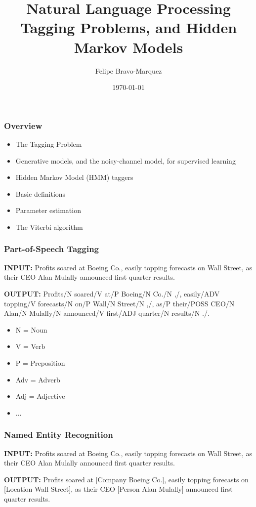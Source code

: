\documentclass[handout]{beamer}
\title{Natural Language Processing \\ Tagging Problems, and Hidden Markov Models}
\author[Felipe Bravo Márquez]{\footnotesize
 \textcolor[rgb]{0.00,0.00,1.00}{Felipe Bravo-Marquez}}
\date{\today}
\begin{document}
\begin{frame}
\titlepage


\end{frame}



\begin{frame}
  \frametitle{Overview}
  \begin{itemize}
    \item The Tagging Problem
    \item Generative models, and the noisy-channel model, for supervised learning
    \item Hidden Markov Model (HMM) taggers
    \item Basic definitions
    \item Parameter estimation
    \item The Viterbi algorithm
  \end{itemize}
\end{frame}

\begin{frame}
  \frametitle{Part-of-Speech Tagging}
  \textbf{INPUT:}
  Profits soared at Boeing Co., easily topping forecasts on Wall Street, as their CEO Alan Mulally announced first quarter results.

  \textbf{OUTPUT:}
  Profits/N soared/V at/P Boeing/N Co./N ,/, easily/ADV topping/V forecasts/N on/P Wall/N Street/N ,/, as/P their/POSS CEO/N Alan/N Mulally/N announced/V first/ADJ quarter/N results/N ./.

  \begin{itemize}
    \item N = Noun
    \item V = Verb
    \item P = Preposition
    \item Adv = Adverb
    \item Adj = Adjective
    \item ...
  \end{itemize}
\end{frame}

\begin{frame}
  \frametitle{Named Entity Recognition}
  \textbf{INPUT:}
  Profits soared at Boeing Co., easily topping forecasts on Wall Street, as their CEO Alan Mulally announced first quarter results.

  \textbf{OUTPUT:}
  Profits soared at [Company Boeing Co.], easily topping forecasts on [Location Wall Street], as their CEO [Person Alan Mulally] announced first quarter results.
\end{frame}
\end{document}
